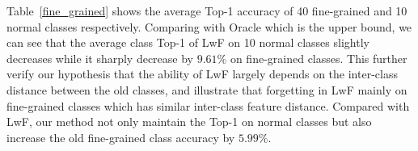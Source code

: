 \documentclass[10pt,twocolumn,letterpaper]{article}
\begin{document}
Table~\ref{fine_grained} shows the average Top-1 accuracy of 40 fine-grained and 10 normal classes respectively.
Comparing with Oracle which is the upper bound, we can see that the average class Top-1 of LwF on 10 normal classes slightly decreases while it sharply decrease by $9.61\%$ on fine-grained classes. This further verify our hypothesis that the ability of LwF largely depends on the inter-class distance between the old classes, and illustrate that forgetting in LwF mainly on fine-grained classes which has similar inter-class feature distance.
Compared with LwF, our method not only maintain the Top-1 on normal classes but also increase the old fine-grained class accuracy by $5.99\%$.  

\begin{table}[t]
\scriptsize
\renewcommand\arraystretch{1.15}
  \begin{center}
    \caption{\small{Average class Top-1 accuracy on CUB-200-2011 and Caltech-101 under our 2-phase setting. This verifies our hypothesis that the ability of LwF largely depends on the inter-class distance between the old classes and that the generated images better consolidate old fine-grained classes knowledge.}}
    \vspace{-3mm}
    \label{fine_grained}
  \end{center}
  \vspace{-5mm}
\end{table}
\end{document}
